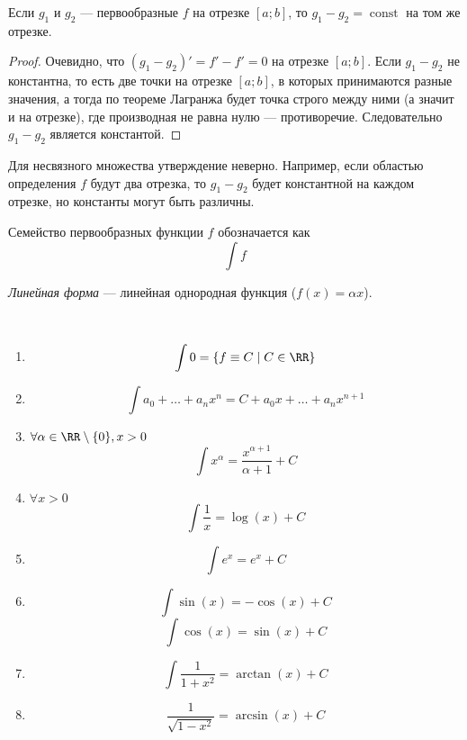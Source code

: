 \documentclass[12pt,a4paper]{article}
\DeclareMathOperator{\const}{const}
\begin{document}
    \begin{theorem}
        Если $g_1$ и $g_2$ --- первообразные $f$ на отрезке $[a; b]$, то $g_1 - g_2 = \const$ на том же отрезке.
    \end{theorem}

    \begin{proof}
        Очевидно, что $(g_1 - g_2)' = f' - f' = 0$ на отрезке $[a; b]$. Если $g_1 - g_2$ не константна, то есть две точки на отрезке $[a; b]$, в которых принимаются разные значения, а тогда по теореме Лагранжа будет точка строго между ними (а значит и на отрезке), где производная не равна нулю --- противоречие. Следовательно $g_1 - g_2$ является константой.
    \end{proof}

    \begin{remark}
        Для несвязного множества утверждение неверно. Например, если областью определения $f$ будут два отрезка, то $g_1 - g_2$ будет константной на каждом отрезке, но константы могут быть различны.
    \end{remark}

    \begin{definition}
        Семейство первообразных функции $f$ обозначается как
        \[\int f\]
    \end{definition}

    \begin{definition}
        \emph{Линейная форма} --- линейная однородная функция ($f(x) = \alpha x$).
    \end{definition}

    \begin{lemma}\ 
        \begin{multicols}{2}
            \begin{enumerate}
                \item \[\int 0 = \{f \equiv C \mid C \in \RR\}\]
                \item \[\int a_0 + \dots + a_n x^n = C + a_0 x + \dots + a_n x^{n+1} \]
                \item $\forall \alpha \in \RR \setminus \{0\}, x > 0$
                    \[\int x^\alpha = \frac{x^{\alpha + 1}}{\alpha + 1} + C\]
                \item $\forall x > 0$
                    \[\int \frac{1}{x} = \log(x) + C\]
                \item \[\int e^x = e^x + C\]
                \item \[\int \sin(x) = -\cos(x) + C\] \[\int \cos(x) = \sin(x) + C\]
                \item \[\int \frac{1}{1+x^2} = \arctan(x) + C\]
                \item \[\frac{1}{\sqrt{1-x^2}} = \arcsin(x) + C\]
            \end{enumerate}
        \end{multicols}
    \end{lemma}
\end{document}

